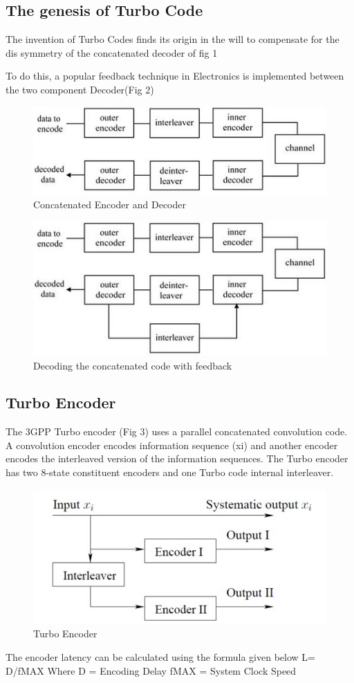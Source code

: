 \documentclass[conference,a4paper]{IEEEtran}
\begin{document}
\subsection{The genesis of Turbo Code}
The invention of Turbo Codes finds its origin in the will to compensate for the dis symmetry of the concatenated decoder of fig 1

To do this, a popular feedback technique in Electronics is implemented between the two component Decoder(Fig 2)
\begin{figure}[h!]
    \centering
    \includegraphics{fig}
    \caption{Concatenated Encoder and Decoder}
    \label{fig:my_label}
\end{figure}
\begin{figure}[h!]
\centering
     \includegraphics{fig12.jpg}
    \caption{Decoding the concatenated code with feedback}
    \label{}
\end{figure}
\subsection{Turbo Encoder
}
The 3GPP Turbo encoder (Fig 3) uses a parallel concatenated convolution code. A convolution encoder encodes information sequence (xi) and another encoder encodes the interleaved version of the information sequences. The Turbo encoder has two 8-state constituent encoders and one Turbo code internal interleaver.
\begin{figure}[h!]
\centering
     \includegraphics[scale=0.48]{turboencode.jpg}
    \caption{Turbo Encoder}
    \label{}
\end{figure}
The encoder latency can be calculated using the formula given below
L= D/fMAX
Where D = Encoding Delay
fMAX = System Clock Speed
\end{document}
